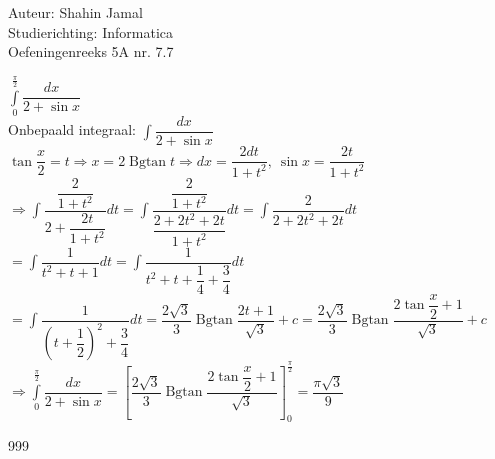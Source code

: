 \documentclass[a4paper]{article}
\begin{document}
  
\noindent \large Auteur: Shahin Jamal \\
\noindent \large Studierichting: Informatica\\
\noindent \large Oefeningenreeks 5A nr. 7.7\\

\medskip

\normalsize

$\displaystyle\int\limits_0^{\tfrac{\pi}{2}} \dfrac{dx}{2+\sin x}$\\

Onbepaald integraal: $\displaystyle\int \dfrac{dx}{2+\sin x}$\\

$\tan\dfrac{x}{2} = t \Rightarrow x = 2\operatorname{Bgtan}t \Rightarrow dx = \dfrac{2dt}{1+t^2}, \ \sin x = \dfrac{2t}{1+t^2}$\\

$\Rightarrow \displaystyle\int \dfrac{\dfrac{2}{1+t^2}}{2+\dfrac{2t}{1+t^2}}dt = \displaystyle\int\dfrac{\dfrac{2}{1+t^2}}{\dfrac{2+2t^2+2t}{1+t^2}}dt = \displaystyle\int\dfrac{2}{2+2t^2+2t}dt$\\

$= \displaystyle\int\dfrac{1}{t^2+t+1}dt = \displaystyle\int\dfrac{1}{t^2+t+\dfrac{1}{4} + \dfrac{3}{4}}dt$\\

$= \displaystyle\int\dfrac{1}{\left(t+\dfrac{1}{2}\right)^2+\dfrac{3}{4}}dt = \dfrac{2\sqrt{3}}{3}\operatorname{Bgtan} \dfrac{2t+1}{\sqrt{3}} + c = \dfrac{2\sqrt{3}}{3}\operatorname{Bgtan} \dfrac{2\tan\dfrac{x}{2}+1}{\sqrt{3}} + c $\\

$\Rightarrow \displaystyle\int\limits_0^{\tfrac{\pi}{2}} \dfrac{dx}{2+\sin x} = \left[\dfrac{2\sqrt{3}}{3}\operatorname{Bgtan} \dfrac{2\tan\dfrac{x}{2}+1}{\sqrt{3}}\right]_0^{\tfrac{\pi}{2}} = \dfrac{\pi\sqrt{3}}{9}$\\

\begin{thebibliography}{999}
\end{thebibliography}
\end{document}
